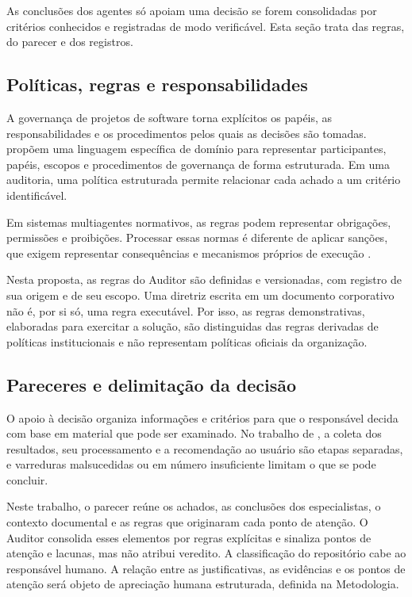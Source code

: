 As conclusões dos agentes só apoiam uma decisão se forem consolidadas por critérios conhecidos e registradas de modo verificável. Esta seção trata das regras, do parecer e dos registros.

\subsection{Políticas, regras e responsabilidades}
\label{rt-2-5-1}

A governança de projetos de software torna explícitos os papéis, as responsabilidades e os procedimentos pelos quais as decisões são tomadas.  propõem uma linguagem específica de domínio para representar participantes, papéis, escopos e procedimentos de governança de forma estruturada. Em uma auditoria, uma política estruturada permite relacionar cada achado a um critério identificável.

Em sistemas multiagentes normativos, as regras podem representar obrigações, permissões e proibições. Processar essas normas é diferente de aplicar sanções, que exigem representar consequências e mecanismos próprios de execução \cite{yan2025}.

Nesta proposta, as regras do Auditor são definidas e versionadas, com registro de sua origem e de seu escopo. Uma diretriz escrita em um documento corporativo não é, por si só, uma regra executável. Por isso, as regras demonstrativas, elaboradas para exercitar a solução, são distinguidas das regras derivadas de políticas institucionais e não representam políticas oficiais da organização.

\subsection{Pareceres e delimitação da decisão}
\label{rt-2-5-2}

O apoio à decisão organiza informações e critérios para que o responsável decida com base em material que pode ser examinado. No trabalho de , a coleta dos resultados, seu processamento e a recomendação ao usuário são etapas separadas, e varreduras malsucedidas ou em número insuficiente limitam o que se pode concluir.

Neste trabalho, o parecer reúne os achados, as conclusões dos especialistas, o contexto documental e as regras que originaram cada ponto de atenção. O Auditor consolida esses elementos por regras explícitas e sinaliza pontos de atenção e lacunas, mas não atribui veredito. A classificação do repositório cabe ao responsável humano. A relação entre as justificativas, as evidências e os pontos de atenção será objeto de apreciação humana estruturada, definida na Metodologia.

